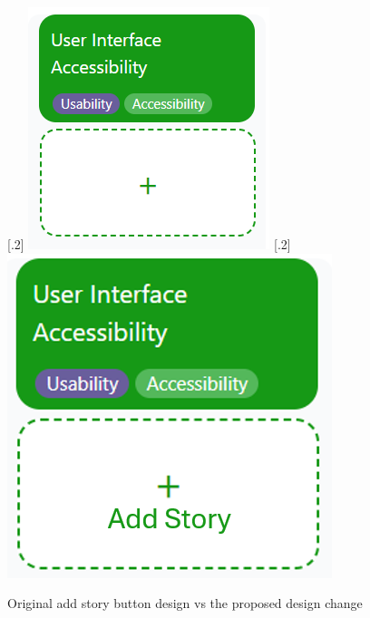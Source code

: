 \documentclass[l4proj.tex]{subfiles}
\begin{document}
\begin{figure}[ht]
    \centering
    [.2\linewidth]{%
        \centering
        \includegraphics[width=\linewidth]{dissertation/images/EvaluationOriginalAddStoryButton.png}%
    }%
    \hspace{1em}
    \centering
    [.2\linewidth]{%
        \centering
        \includegraphics[width=\linewidth]{dissertation/images/EvaluationNewAddStoryButton.png}%
    }
    \caption{Original add story button design vs the proposed design change}
    \label{fig:original vs new add story design} 
\end{figure}
\end{document}
